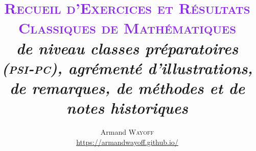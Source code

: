 \documentclass[
	a4paper, %
	fontsize=8pt, %
	twoside=true, %
	chapterentrydots=true, %
	numbers=noenddot, %
]{kaobook}
\begin{document}


\title[Recueil des Exercices et Résultats Classiques de Mathématiques]{\fontsize{26pt}{28pt}\selectfont \textcolor{BlueViolet}{\textrm{\textsc{Recueil d'Exercices et Résultats Classiques de Mathématiques}}} \\ \vspace{0.6cm} \fontsize{16pt}{18pt}\selectfont \textrm{\textsl{de niveau classes préparatoires (\textsc{psi}-\textsc{pc}), agrémenté d’illustrations, de remarques, de méthodes et de notes historiques}} \\}

\author[Armand Wayoff]{Armand \textsc{Wayoff} \\ \url{https://armandwayoff.github.io/}}

\date{}



\frontmatter %



\maketitle

\end{document}
